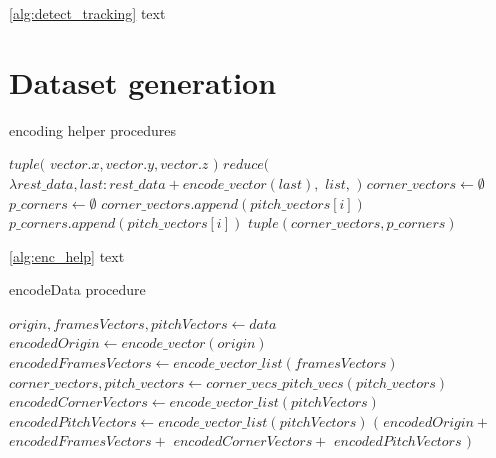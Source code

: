 \documentclass[
    11pt,
    oneside
]{report}
\begin{document}
\ref{alg:detect_tracking} text





\section{Dataset generation}


\begin{algorithm}[H]
\begin{algorithmic}
\caption{encoding helper procedures}\label{alg:enc_help}
    \Return $tuple($
        \State \indent $vector.x, vector.y, vector.z$
    \State $)$
\EndProcedure
{}
    \Return $reduce($
        \State \indent $\lambda rest\_data, last: rest\_data + encode\_vector(last),$
        \State \indent $list,$
        \State \indent \emptyset {}
    \State $)$
\EndProcedure
{}
    \State $corner\_vectors \gets \emptyset$
    \State $p\_corners \gets \emptyset$
            \State $corner\_vectors.append(pitch\_vectors[i])$
        \Else
            \State $p\_corners.append(pitch\_vectors[i])$
        \EndIf
    \EndFor
    \State
    \Return $tuple(corner\_vectors, p\_corners)$
\EndProcedure
\end{algorithmic}
\end{algorithm}


\ref{alg:enc_help} text


\begin{algorithm}[H]
\begin{algorithmic}
\caption{encodeData procedure}\label{alg:enc_data}
    \State $origin, framesVectors, pitchVectors \gets data$
    \State $encodedOrigin \gets encode\_vector(origin)$
    \State $encodedFramesVectors \gets encode\_vector\_list(framesVectors)$
    \State $corner\_vectors, pitch\_vectors \gets corner\_vecs\_pitch\_vecs(pitch\_vectors)$
    \State $encodedCornerVectors \gets encode\_vector\_list(pitchVectors)$
    \State $encodedPitchVectors \gets encode\_vector\_list(pitchVectors)$
    \State
    \Return $($
        \State \indent $encodedOrigin +$
        \State \indent $encodedFramesVectors +$
        \State \indent $encodedCornerVectors +$
        \State \indent $encodedPitchVectors$
    \State $)$
\EndProcedure
\end{algorithmic}
\end{algorithm}
\end{document}
